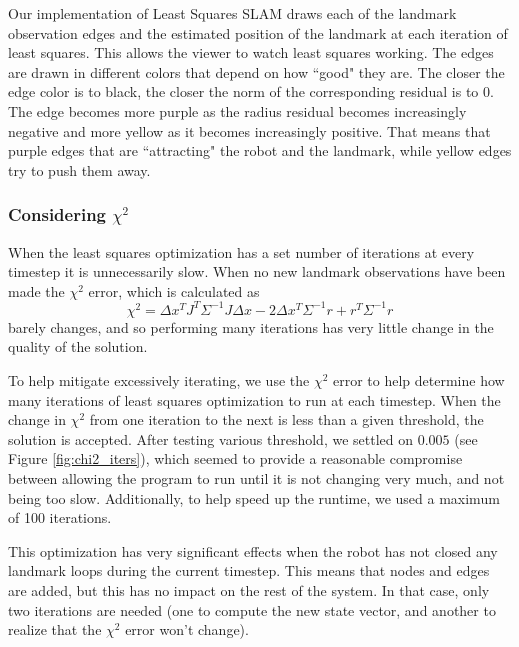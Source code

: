\documentclass[12pt]{article}
\begin{document}
Our implementation of Least Squares SLAM draws each of the landmark observation edges and the estimated position of the landmark at each iteration of least squares.  This allows the viewer to watch least squares working. The edges are drawn in different colors that depend on how ``good" they are.  The closer the edge color is to black, the closer the norm of the corresponding residual is to 0.  The edge becomes more purple as the radius residual becomes increasingly negative and more yellow as it becomes increasingly positive. That means that purple edges that are ``attracting" the robot and the landmark, while yellow edges try to push them away.

\subsubsection*{Considering $\chi^2$}
When the least squares optimization has a set number of iterations at every timestep it is unnecessarily slow.  When no new landmark observations have been made the $\chi^2$ error, which is calculated as
$$\chi^2 = \Delta x^TJ^T\Sigma^{-1}J\Delta x - 2\Delta x^T\Sigma^{-1}r + r^T\Sigma^{-1}r$$
barely changes, and so performing many iterations has very little change in the quality of the solution.

To help mitigate excessively iterating, we use the $\chi^2$ error to help determine how many iterations of least squares optimization to run at each timestep.  When the change in $\chi^2$ from one iteration to the next is less than a given threshold, the solution is accepted.  After testing various threshold, we settled on $0.005$ (see Figure \ref{fig:chi2_iters}), which seemed to provide a reasonable compromise between allowing the program to run until it is not changing very much, and not being too slow.  Additionally, to help speed up the runtime, we used a maximum of 100 iterations.

This optimization has very significant effects when the robot has not closed any landmark loops during the current timestep. This means that nodes and edges are added, but this has no impact on the rest of the system. In that case, only two iterations are needed (one to compute the new state vector, and another to realize that the $\chi^2$ error won't change).
\end{document}
